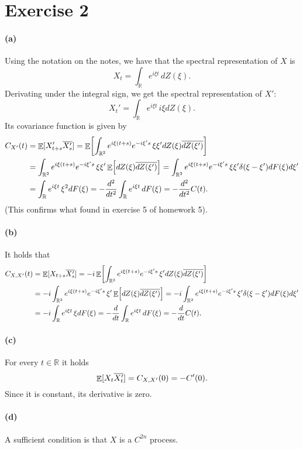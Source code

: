 \documentclass[a4paper,11pt]{article}
\theoremstyle{definition}
\theoremstyle{plain}
\theoremstyle{remark}
\DeclarePairedDelimiter{\parq}{[}{]}
\DeclareMathOperator*{\expval}{\mathbb{E}}
\begin{document}
\section*{Exercise 2}

\paragraph*{(a)}

Using the notation on the notes, we have that the spectral representation of $X$ is 
$$
X_t = \int_\mathbb{R} e^{i\xi t}\,dZ(\xi).
$$
Derivating under the integral sign, we get the spectral representation of $X'$:
$$
X_t' = \int_\mathbb{R} e^{i\xi t}\,i\xi dZ(\xi).
$$
Its covariance function is given by
\begin{align*}
C_{X'}(t) & = \expval\parq{X_{t+s}'\overline{X_s'}} = \expval\parq*{\int_{\mathbb{R}^2} e^{i\xi (t+s)}e^{-i\xi's}\,\xi\xi'dZ(\xi)\overline{dZ(\xi')}} \\ & = \int_{\mathbb{R}^2} e^{i\xi (t+s)}e^{-i\xi's}\,\xi\xi'\expval\parq*{dZ(\xi)\overline{dZ(\xi')}} = \int_{\mathbb{R}^2} e^{i\xi (t+s)}e^{-i\xi's}\,\xi\xi'\delta(\xi-\xi')dF(\xi)d\xi' \\ & = \int_\mathbb{R} e^{i\xi t}\,\xi^2 dF(\xi) = -\frac{d^2}{dt^2}\int_\mathbb{R} e^{i\xi t}\,dF(\xi) = -\frac{d^2}{dt^2}C(t).
\end{align*}
(This confirms what found in exercise 5 of homework 5).

\paragraph*{(b)}
 
It holds that
\begin{align*}
C_{X,X'}(t) & = \expval\parq{X_{t+s}\overline{X_s'}} = -i\expval\parq*{\int_{\mathbb{R}^2} e^{i\xi (t+s)}e^{-i\xi's}\,\xi'dZ(\xi)\overline{dZ(\xi')}} \\ & = -i\int_{\mathbb{R}^2} e^{i\xi (t+s)}e^{-i\xi's}\,\xi'\expval\parq*{dZ(\xi)\overline{dZ(\xi')}} = -i\int_{\mathbb{R}^2} e^{i\xi (t+s)}e^{-i\xi's}\,\xi'\delta(\xi-\xi')dF(\xi)d\xi' \\ & = -i\int_\mathbb{R} e^{i\xi t}\,\xi dF(\xi) = -\frac{d}{dt}\int_\mathbb{R} e^{i\xi t}\,dF(\xi) = -\frac{d}{dt}C(t).
\end{align*} 

\paragraph*{(c)}

For every $t\in\mathbb{R}$ it holds
$$
\expval\parq{X_{t}\overline{X_t'}} = C_{X,X'}(0) = -C'(0).
$$
Since it is constant, its derivative is zero.

\paragraph*{(d)}

A sufficient condition is that $X$ is a $C^{2n}$ process.
 
\end{document}
